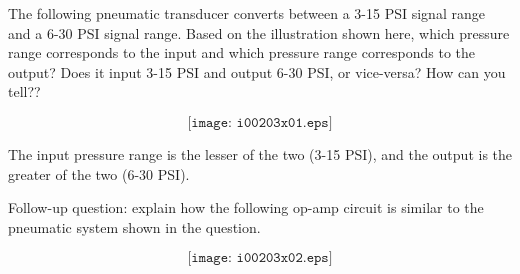 

The following pneumatic transducer converts between a 3-15 PSI signal range and a 6-30 PSI signal range.  Based on the illustration shown here, which pressure range corresponds to the input and which pressure range corresponds to the output?  Does it input 3-15 PSI and output 6-30 PSI, or vice-versa?  How can you tell??

$$\texttt{[image: i00203x01.eps]}$$







The input pressure range is the lesser of the two (3-15 PSI), and the output is the greater of the two (6-30 PSI).

\vskip 10pt

Follow-up question: explain how the following op-amp circuit is similar to the pneumatic system shown in the question.

$$\texttt{[image: i00203x02.eps]}$$











